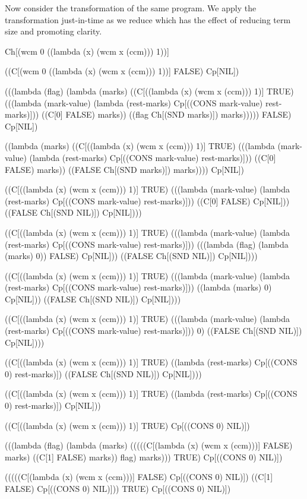 \documentclass{llncs}
\begin{document}
Now consider the transformation of the same program. We apply the transformation just-in-time as we reduce which has the effect of reducing term size and promoting clarity.
\begin{schemedisplay}
Ch[(wcm 0 ((lambda (x) (wcm x (ccm))) 1))]

((C[(wcm 0 ((lambda (x) (wcm x (ccm))) 1))] FALSE) Cp[NIL])

(((lambda (flag)
    (lambda (marks)
      ((C[((lambda (x) (wcm x (ccm))) 1)] TRUE)
       (((lambda (mark-value) (lambda (rest-marks) Cp[((CONS mark-value) rest-marks)]))
         ((C[0] FALSE) marks)) ((flag Ch[(SND marks)]) marks)))))
  FALSE) Cp[NIL])

((lambda (marks)
   ((C[((lambda (x) (wcm x (ccm))) 1)] TRUE)
    (((lambda (mark-value) (lambda (rest-marks) Cp[((CONS mark-value) rest-marks)]))
      ((C[0] FALSE) marks)) ((FALSE Ch[(SND marks)]) marks))))
 Cp[NIL])

((C[((lambda (x) (wcm x (ccm))) 1)] TRUE)
 (((lambda (mark-value) (lambda (rest-marks) Cp[((CONS mark-value) rest-marks)]))
   ((C[0] FALSE) Cp[NIL])) ((FALSE Ch[(SND NIL)]) Cp[NIL])))

((C[((lambda (x) (wcm x (ccm))) 1)] TRUE)
 (((lambda (mark-value) (lambda (rest-marks) Cp[((CONS mark-value) rest-marks)]))
   (((lambda (flag) (lambda (marks) 0)) FALSE) Cp[NIL])) ((FALSE Ch[(SND NIL)]) Cp[NIL])))

((C[((lambda (x) (wcm x (ccm))) 1)] TRUE)
 (((lambda (mark-value) (lambda (rest-marks) Cp[((CONS mark-value) rest-marks)]))
   ((lambda (marks) 0) Cp[NIL])) ((FALSE Ch[(SND NIL)]) Cp[NIL])))

((C[((lambda (x) (wcm x (ccm))) 1)] TRUE)
 (((lambda (mark-value) (lambda (rest-marks) Cp[((CONS mark-value) rest-marks)]))
   0) ((FALSE Ch[(SND NIL)]) Cp[NIL])))

((C[((lambda (x) (wcm x (ccm))) 1)] TRUE)
 ((lambda (rest-marks) Cp[((CONS 0) rest-marks)])
  ((FALSE Ch[(SND NIL)]) Cp[NIL])))

((C[((lambda (x) (wcm x (ccm))) 1)] TRUE)
 ((lambda (rest-marks) Cp[((CONS 0) rest-marks)])
  Cp[NIL]))

((C[((lambda (x) (wcm x (ccm))) 1)] TRUE) Cp[((CONS 0) NIL)])

(((lambda (flag)
    (lambda (marks)
      (((((C[(lambda (x) (wcm x (ccm)))] FALSE) marks)
         ((C[1] FALSE) marks))
        flag)
       marks))) TRUE) Cp[((CONS 0) NIL)])

(((((C[(lambda (x) (wcm x (ccm)))] FALSE) Cp[((CONS 0) NIL)])
   ((C[1] FALSE) Cp[((CONS 0) NIL)]))
  TRUE) Cp[((CONS 0) NIL)])


\end{schemedisplay}
\end{document}
